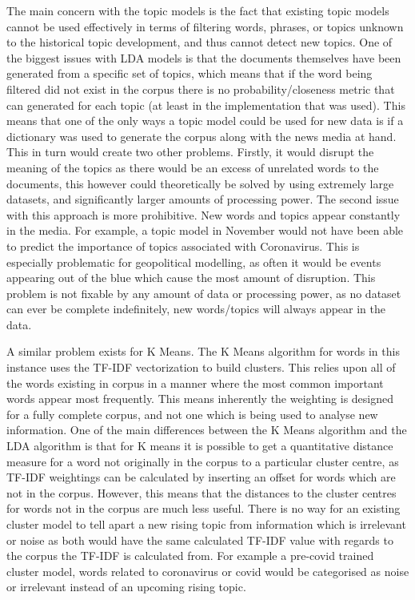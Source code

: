 The main concern with the topic models is the fact that existing topic models cannot be used effectively in terms of filtering words, phrases, or topics unknown to the historical topic development, and thus cannot detect new topics. One of the biggest issues with LDA models is that the documents themselves have been generated from a specific set of topics, which means that if the word being filtered did not exist in the corpus there is no probability/closeness metric that can generated for each topic (at least in the implementation that was used). This means that one of the only ways a topic model could be used for new data is if a dictionary was used to generate the corpus along with the news media at hand. This in turn would create two other problems. Firstly, it would disrupt the meaning of the topics as there would be an excess of unrelated words to the documents, this however could theoretically be solved by using extremely large datasets, and significantly larger amounts of processing power. The second issue with this approach is more prohibitive. New words and topics appear constantly in the media. For example, a topic model in November would not have been able to predict the importance of topics associated with Coronavirus. This is especially problematic for geopolitical modelling, as often it would be events appearing out of the blue which cause the most amount of disruption. This problem is not fixable by any amount of data or processing power, as no dataset can ever be complete indefinitely, new words/topics will always appear in the data.  

A similar problem exists for K Means. The K Means algorithm for words in this instance uses the TF-IDF vectorization to build clusters. This relies upon all of the words existing in corpus in a manner where the most common important words appear most frequently. This means inherently the weighting is designed for a fully complete corpus, and not one which is being used to analyse new information. One of the main differences between the K Means algorithm and the LDA algorithm is that for K means it is possible to get a quantitative distance measure for a word not originally in the corpus to a particular cluster centre, as TF-IDF weightings can be calculated by inserting an offset for words which are not in the corpus. However, this means that the distances to the cluster centres for words not in the corpus are much less useful. There is no way for an existing cluster model to tell apart a new rising topic from information which is irrelevant or noise as both would have the same calculated TF-IDF value with regards to the corpus the TF-IDF is calculated from. For example a pre-covid trained cluster model, words related to coronavirus or covid would be categorised as noise or irrelevant instead of an upcoming rising topic.

